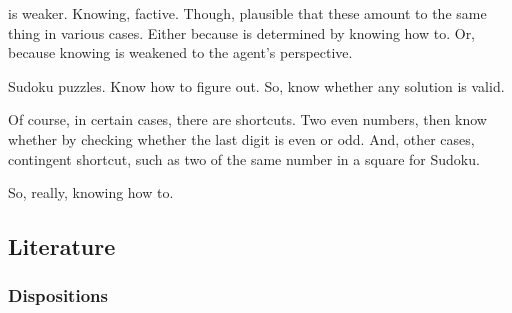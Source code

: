 \begin{note}
   is weaker.
  Knowing, factive.
  Though, plausible that these amount to the same thing in various cases.
  Either because \fc{} is determined by knowing how to.
  Or, because knowing is weakened to the agent's perspective.

  Sudoku puzzles.
  Know how to figure out.
  So, know whether any solution is valid.

  Of course, in certain cases, there are shortcuts.
  Two even numbers, then know whether by checking whether the last digit is even or odd.
  And, other cases, contingent shortcut, such as two of the same number in a square for Sudoku.

  So, really, knowing how to.
\end{note}

\subsection{Literature}
\label{cha:fcs:sec:literature}

\subsubsection{Dispositions}
\label{sec:dispositions}

